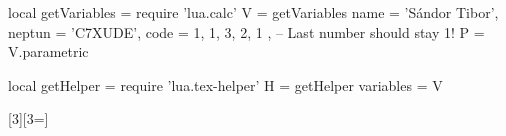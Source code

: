 \usepackage{luacode}

\begin{luacode}
  local getVariables = require 'lua.calc'
  V = getVariables {
      name = 'Sándor Tibor',
      neptun = 'C7XUDE',
      code = { 1, 1, 3, 2, 1 }, -- Last number should stay 1!
    }
  P = V.parametric

  local getHelper = require 'lua.tex-helper'
  H = getHelper {
      variables = V
    }
\end{luacode}

\usepackage{xargs}
\newcommand{\lv}[1]{\directlua{H.printVar [[#1]]}}
\newcommand{\lvec}[2]{\directlua{H.printVec { name="#1", index=#2 }}}
[3][3=]{}
\newcommand{\dv}[1]{\directlua{H.printDirect(#1)}}


